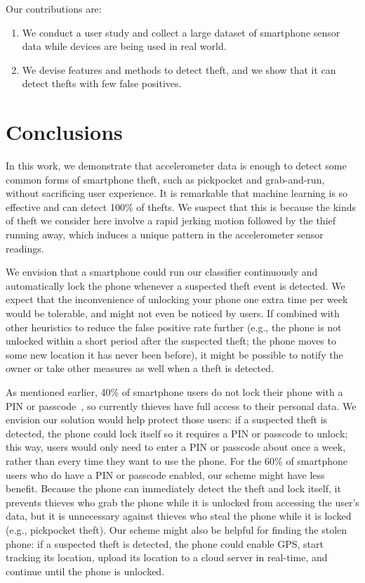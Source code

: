 Our contributions are:
\begin{enumerate}
  \item We conduct a user study and collect a large dataset of smartphone sensor data while devices are being used in real world.
  \item We devise features and methods to detect theft, and we show that it can detect thefts with few false positives.
\end{enumerate}


% 
% 

\section{Conclusions}

In this work, we demonstrate that accelerometer data is enough to detect some common forms of smartphone theft, such as pickpocket and grab-and-run, without sacrificing user experience. 
It is remarkable that machine learning is so effective and can detect 100\% of thefts.
We suspect that this is because the kinds of theft we consider here involve a rapid jerking motion followed by the thief running away, which induces a unique pattern in the accelerometer sensor readings.

We envision that a smartphone could run our classifier continuously and automatically lock the phone whenever a suspected theft event is detected.
We expect that the inconvenience of unlocking your phone one extra time per week would be tolerable, and might not even be noticed by users.
If combined with other heuristics to reduce the false positive rate further (e.g., the phone is not unlocked within a short period after the suspected theft; the phone moves to some new location it has never been before), it might be possible to notify the owner or take other measures as well when a theft is detected.

As mentioned earlier, 40\% of smartphone users do not lock their phone with a PIN or passcode~\cite{egelman:lock}, so currently thieves have full access to their personal data.
We envision our solution would help protect those users: if a suspected theft is detected, the phone could lock itself so it requires a PIN or passcode to unlock; this way, users would only need to enter a PIN or passcode about once a week, rather than every time they want to use the phone.
For the 60\% of smartphone users who do have a PIN or passcode enabled, our scheme might have less benefit.
Because the phone can immediately detect the theft and lock itself, it prevents thieves who grab the phone while it is unlocked from accessing the user's data, but it is unnecessary against thieves who steal the phone while it is locked (e.g., pickpocket theft).
Our scheme might also be helpful for finding the stolen phone: if a suspected theft is detected, the phone could enable GPS, start tracking its location, upload its location to a cloud server in real-time, and continue until the phone is unlocked.


